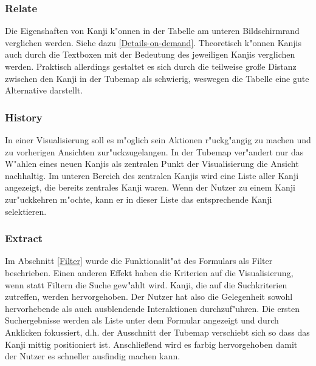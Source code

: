 \subsubsection{Relate}
Die Eigenshaften von Kanji k"onnen in der Tabelle am unteren Bildschirmrand verglichen werden. Siehe dazu \ref{Details-on-demand}. Theoretisch k"onnen Kanjis auch durch die Textboxen mit der Bedeutung des jeweiligen Kanjis verglichen werden. Praktisch allerdings gestaltet es sich durch die teilweise große Distanz zwischen den Kanji in der Tubemap als schwierig, weswegen die Tabelle eine gute Alternative darstellt. 

\subsubsection{History}
In einer Visualisierung soll es m"oglich sein Aktionen r"uckg"angig zu machen und zu vorherigen Ansichten zur"uckzugelangen. In der Tubemap ver"andert nur das W"ahlen eines neuen Kanjis als zentralen Punkt der Visualisierung die Ansicht nachhaltig. Im unteren Bereich des zentralen Kanjis wird eine Liste aller Kanji angezeigt, die bereits zentrales Kanji waren. Wenn der Nutzer zu einem Kanji zur"uckkehren m"ochte, kann er in dieser Liste das entsprechende Kanji selektieren.


\subsubsection{Extract}
Im Abschnitt \ref{Filter} wurde die Funktionalit"at des Formulars als Filter beschrieben. Einen anderen Effekt haben die Kriterien auf die Visualisierung, wenn statt Filtern die Suche gew"ahlt wird. Kanji, die auf die Suchkriterien zutreffen, werden hervorgehoben. Der Nutzer hat also die Gelegenheit sowohl hervorhebende als auch ausblendende Interaktionen durchzuf"uhren. Die ersten Suchergebnisse werden als Liste unter dem Formular angezeigt und durch Anklicken fokussiert, d.h. der Ausschnitt der Tubemap verschiebt sich so dass das Kanji mittig positioniert ist. Anschließend  wird es farbig hervorgehoben damit der Nutzer es schneller ausfindig machen kann. 